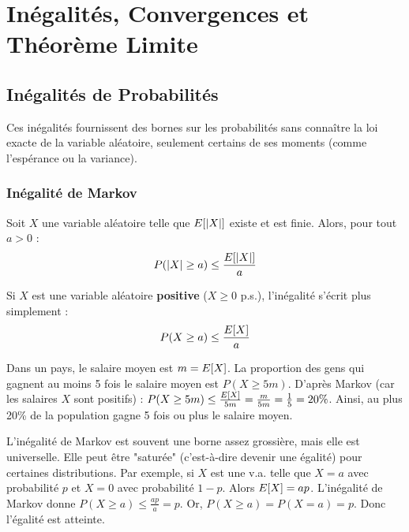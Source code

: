 \chapter{Inégalités, Convergences et Théorème Limite}

\section{Inégalités de Probabilités}

Ces inégalités fournissent des bornes sur les probabilités sans connaître la loi exacte de la variable aléatoire, seulement certains de ses moments (comme l'espérance ou la variance).

\subsection{Inégalité de Markov}

Soit $X$ une variable aléatoire telle que $E[|X|]$ existe et est finie. Alors, pour tout $a > 0$ :
\[ P(|X| \ge a) \le \frac{E[|X|]}{a} \]

Si $X$ est une variable aléatoire \textbf{positive} ($X \ge 0$ p.s.), l'inégalité s'écrit plus simplement :
\[ P(X \ge a) \le \frac{E[X]}{a} \]

\begin{exemple}
Dans un pays, le salaire moyen est $m = E[X]$. La proportion des gens qui gagnent au moins 5 fois le salaire moyen est $P(X \ge 5m)$. D'après Markov (car les salaires $X$ sont positifs) :
$P(X \ge 5m) \le \frac{E[X]}{5m} = \frac{m}{5m} = \frac{1}{5} = 20\%$. Ainsi, au plus 20\% de la population gagne 5 fois ou plus le salaire moyen.
\end{exemple}

\begin{remarque}
L'inégalité de Markov est souvent une borne assez grossière, mais elle est universelle. Elle peut être "saturée" (c'est-à-dire devenir une égalité) pour certaines distributions. Par exemple, si $X$ est une v.a. telle que $X = a$ avec probabilité $p$ et $X = 0$ avec probabilité $1 - p$. Alors $E[X] = ap$. L'inégalité de Markov donne $P(X \ge a) \le \frac{ap}{a} = p$. Or, $P(X \ge a) = P(X = a) = p$. Donc l'égalité est atteinte.
\end{remarque}


